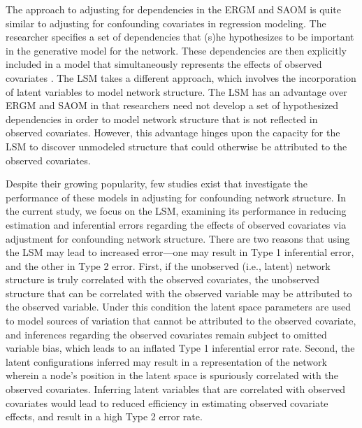 \documentclass[11pt]{article}
\begin{document}
The approach to adjusting for dependencies in the ERGM and SAOM is
quite similar to adjusting for confounding covariates in regression
modeling. The researcher specifies a set of dependencies that (s)he
hypothesizes to be important in the generative model for the
network. These dependencies are then explicitly included in a model
that simultaneously represents the effects of observed covariates
\citep{cranmer2011pa}. The LSM takes a different approach, which
involves the incorporation of latent variables to model network
structure. The LSM has an advantage over ERGM and SAOM in that
researchers need not develop a set of hypothesized dependencies in
order to model network structure that is not reflected in observed
covariates. However, this advantage hinges upon the capacity for the
LSM to discover unmodeled structure that could otherwise be attributed
to the observed covariates.

Despite their growing popularity, few studies exist that investigate
the performance of these models in adjusting for confounding network
structure. In the current study, we focus on the LSM, examining its
performance in reducing estimation and inferential errors regarding
the effects of observed covariates via adjustment for confounding
network structure. There are two reasons that using the LSM may lead
to increased error---one may result in Type 1 inferential error, and
the other in Type 2 error. First, if the unobserved (i.e., latent)
network structure is truly correlated with the observed covariates,
the unobserved structure that can be correlated with the observed
variable may be attributed to the observed variable. Under this
condition the latent space parameters are used to model sources of
variation that cannot be attributed to the observed covariate, and
inferences regarding the observed covariates remain subject to omitted
variable bias, which leads to an inflated Type 1 inferential error
rate. Second, the latent configurations inferred may result in a
representation of the network wherein a node's position in the latent
space is spuriously correlated with the observed covariates. Inferring
latent variables that are correlated with observed covariates would
lead to reduced efficiency in estimating observed covariate effects,
and result in a high Type 2 error rate.
\end{document}
